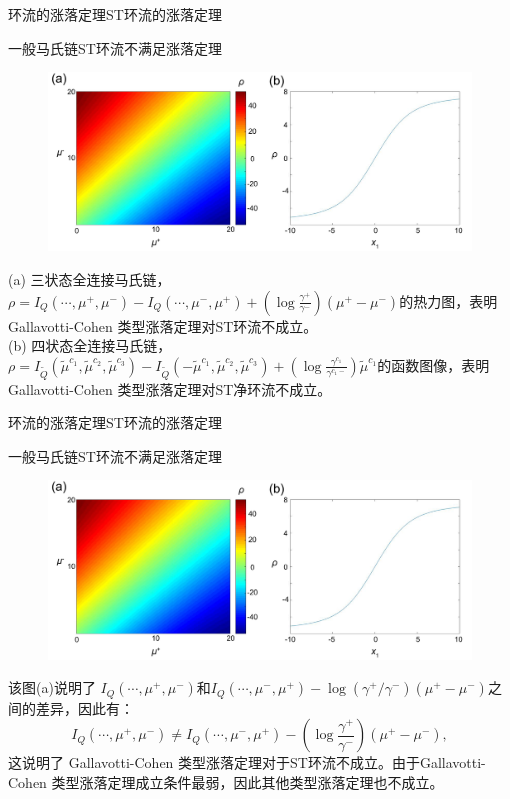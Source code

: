 \documentclass{beamer}
\begin{document}
\begin{frame}{环流的涨落定理}{ST环流的涨落定理}
	\begin{block}{一般马氏链ST环流不满足涨落定理}
		\begin{figure}[h]
			\centering
			\includegraphics[scale=0.14]{chart/ratefunction.pdf}
		\end{figure}
		{\tiny (a) 三状态全连接马氏链，$\rho=I_Q(\cdots,\mu^+,\mu^-)-I_Q(\cdots,\mu^-,\mu^+)+(\log\frac{\gamma^+}{\gamma^-})(\mu^+-\mu^-)$的热力图，表明Gallavotti-Cohen 类型涨落定理对ST环流不成立。 \\
		(b) 四状态全连接马氏链，$\rho=I_{\tilde{Q}}(\tilde{\mu}^{c_1},\tilde{\mu}^{c_2},\tilde{\mu}^{c_3})-  I_{\tilde{Q}}(-\tilde{\mu}^{c_1},\tilde{\mu}^{c_2},\tilde{\mu}^{c_3})+(\log\frac{\gamma^{c_1}}{\gamma^{c_1-}})\tilde{\mu}^{c_1}$的函数图像，表明Gallavotti-Cohen 类型涨落定理对ST净环流不成立。}
	\end{block}
\end{frame}

\begin{frame}{环流的涨落定理}{ST环流的涨落定理}
	\begin{block}{一般马氏链ST环流不满足涨落定理}
		\begin{figure}[h]
			\centering
			\includegraphics[scale=0.14]{chart/ratefunction.pdf}
		\end{figure}
		{\tiny 该图(a)说明了 $I_Q(\cdots,\mu^+,\mu^-)$和$I_Q(\cdots,\mu^-,\mu^+)-\log(\gamma^+ /\gamma^-) (\mu^+-\mu^-)$之间的差异，因此有：
		\begin{equation*}
		I_Q(\cdots,\mu^+,\mu^-)
		\neq I_Q(\cdots,\mu^-,\mu^+)-\left(\log\frac{\gamma^+}{\gamma^-}\right)(\mu^+-\mu^-),
		\end{equation*}
		这说明了 Gallavotti-Cohen 类型涨落定理对于ST环流不成立。由于Gallavotti-Cohen 类型涨落定理成立条件最弱，因此其他类型涨落定理也不成立。}
	\end{block}
\end{frame}
\end{document}
